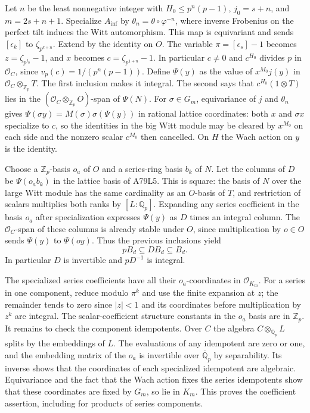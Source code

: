 Let $n$ be the least nonnegative integer with $H_0\le p^n(p-1)$,
$j_0=s+n$, and $m=2s+n+1$. Specialize $A_{\inf}$ by
$\theta_n=\theta\circ\varphi^{-n}$, where inverse Frobenius on the
perfect tilt induces the Witt automorphism. This map is equivariant
and sends $[\epsilon_k]$ to $\zeta_{p^{k+n}}$. Extend by the
identity on $O$. The variable $\pi=[\epsilon_s]-1$ becomes
$z=\zeta_{p^{j_0}}-1$, and $x$ becomes
$c=\zeta_{p^{1+n}}-1$. In particular $c\ne0$ and
$c^{H_0}$ divides $p$ in $\mathcal O_C$, since
$v_p(c)=1/(p^n(p-1))$. Define $\Psi(y)$ as the value of
$x^{M_0}j(y)$ in $\mathcal O_C\otimes_{\mathbb Z_p}T$.
The first inclusion makes it integral. The second says that
$c^{H_0}(1\otimes T)$ lies in the
$(\mathcal O_C\otimes_{\mathbb Z_p}O)$-span of $\Psi(N)$.
For $\sigma\in G_m$, equivariance of $j$ and $\theta_n$ gives
$\Psi(\sigma y)=M(\sigma)\sigma(\Psi(y))$ in rational lattice
coordinates: both $x$ and $\sigma x$ specialize to $c$, so the
identities in the big Witt module may be cleared by $x^{M_0}$
on each side and the nonzero scalar $c^{M_0}$ then cancelled.
On $H$ the Wach action on $y$ is the identity.

Choose a $\mathbb Z_p$-basis $o_a$ of $O$ and a series-ring basis
$b_k$ of $N$. Let the columns of $D$ be $\Psi(o_a b_k)$ in the
lattice basis of A79L5. This is square: the basis of $N$ over the
large Witt module has the same cardinality as an $O$-basis of $T$,
and restriction of scalars multiplies both ranks by $[L:\mathbb Q_p]$.
Expanding any series coefficient in the basis $o_a$ after
specialization expresses $\Psi(y)$ as $D$ times an integral
column. The $\mathcal O_C$-span of these columns is already stable
under $O$, since multiplication by $o\in O$ sends $\Psi(y)$ to
$\Psi(oy)$. Thus the previous inclusions yield
\[
          p B_d\subseteq D B_d\subseteq B_d.
\]
In particular $D$ is invertible and $pD^{-1}$ is integral.

The specialized series coefficients have all their $o_a$-coordinates
in $\mathcal O_{K_m}$. For a series in one component, reduce modulo
$\pi^k$ and use the finite expansion at $z$; the remainder tends
to zero since $|z|<1$ and its coordinates before multiplication by
$z^k$ are integral. The scalar-coefficient structure constants in the
$o_a$ basis are in $\mathbb Z_p$. It remains to check the component
idempotents. Over $C$ the algebra $C\otimes_{\mathbb Q_p}L$
splits by the embeddings of $L$. The evaluations of any idempotent
are zero or one, and the embedding matrix of the $o_a$ is invertible
over $\overline{\mathbb Q}_p$ by separability. Its inverse shows that
the coordinates of each specialized idempotent are algebraic.
Equivariance and the fact that the Wach action fixes the series
idempotents show that these coordinates are fixed by $G_m$,
so lie in $K_m$. This proves the coefficient assertion, including
for products of series components.

